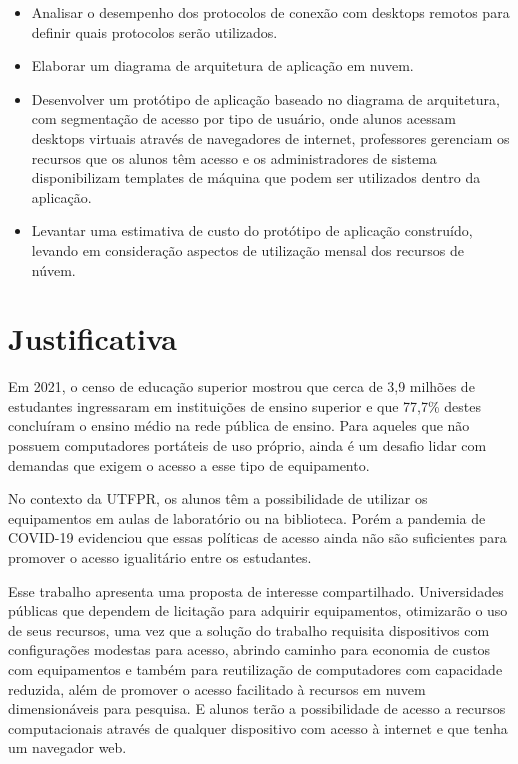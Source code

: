 \begin{itemize}
    \item Analisar o desempenho dos protocolos de conexão com \glspl{desktop} remotos para definir
    quais protocolos serão utilizados.

    \item Elaborar um diagrama de arquitetura de aplicação em nuvem.

    \item Desenvolver um protótipo de aplicação baseado no diagrama de arquitetura, com segmentação
    de acesso por tipo de usuário, onde alunos acessam \glspl{desktop} virtuais através de
    navegadores de internet, professores gerenciam os recursos que os alunos têm acesso e os
    administradores de sistema disponibilizam templates de máquina que podem ser utilizados dentro
    da aplicação.

    \item Levantar uma estimativa de custo do protótipo de aplicação construído, levando em
    consideração aspectos de utilização mensal dos recursos de núvem.
\end{itemize}

\section{Justificativa}\label{sec:justificativa}

Em 2021, o censo de educação superior mostrou que cerca de 3,9 milhões de estudantes ingressaram em
instituições de ensino superior e que 77,7\% destes concluíram o ensino médio na rede pública de
ensino. \citep{inep2021}
Para aqueles que não possuem computadores portáteis de uso próprio, ainda é um desafio lidar com
demandas que exigem o acesso a esse tipo de equipamento.

No contexto da UTFPR, os alunos têm a possibilidade de utilizar os equipamentos em aulas de
laboratório ou na biblioteca. Porém a pandemia de COVID-19 evidenciou que essas políticas de acesso
ainda não são suficientes para promover o acesso igualitário entre os estudantes.

Esse trabalho apresenta uma proposta de interesse compartilhado. Universidades públicas que dependem
de licitação para adquirir equipamentos, otimizarão o uso de seus recursos, uma vez que a solução do
trabalho requisita dispositivos com configurações modestas para acesso, abrindo caminho para
economia de custos com equipamentos e também para reutilização de computadores com capacidade
reduzida, além de promover o acesso facilitado à recursos em nuvem dimensionáveis para pesquisa. E
alunos terão a possibilidade de acesso a recursos computacionais através de qualquer dispositivo com
acesso à internet e que tenha um navegador web.


